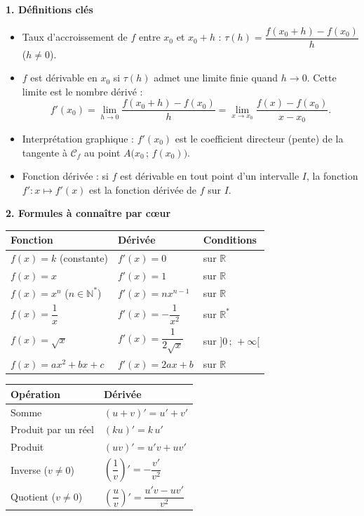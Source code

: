 \documentclass[11pt]{article}
\newcommand{\cle}[1]{{\popxbold\color{popdark}#1}}
\begin{document}
\begin{bilan}
\textbf{1. Définitions clés}
\begin{itemize}
  \item \cle{Taux d'accroissement} de $f$ entre $x_0$ et $x_0+h$ : $\tau(h)=\dfrac{f(x_0+h)-f(x_0)}{h}$ ($h\neq 0$).
  \item $f$ est \cle{dérivable en $x_0$} si $\tau(h)$ admet une limite finie quand $h\to 0$. Cette limite est le \cle{nombre dérivé} :
  \[ f'(x_0)=\lim_{h\to 0}\dfrac{f(x_0+h)-f(x_0)}{h}=\lim_{x\to x_0}\dfrac{f(x)-f(x_0)}{x-x_0}. \]
  \item \cle{Interprétation graphique} : $f'(x_0)$ est le coefficient directeur (pente) de la tangente à $\mathcal{C}_f$ au point $A\bigl(x_0\,;\,f(x_0)\bigr)$.
  \item \cle{Fonction dérivée} : si $f$ est dérivable en tout point d'un intervalle $I$, la fonction $f' : x\mapsto f'(x)$ est la fonction dérivée de $f$ sur $I$.
\end{itemize}

\textbf{2. Formules à connaître par c\oe ur}
\begin{center}
\begin{tabularx}{\linewidth}{|l|X|X|}
\hline
\rowcolor{popblueL} \textbf{Fonction} & \textbf{Dérivée} & \textbf{Conditions} \\
\hline
$f(x)=k$ (constante) & $f'(x)=0$ & sur $\mathbb{R}$ \\
\hline
$f(x)=x$ & $f'(x)=1$ & sur $\mathbb{R}$ \\
\hline
$f(x)=x^n$ ($n\in\mathbb{N}^*$) & $f'(x)=nx^{n-1}$ & sur $\mathbb{R}$ \\
\hline
$f(x)=\dfrac{1}{x}$ & $f'(x)=-\dfrac{1}{x^2}$ & sur $\mathbb{R}^*$ \\
\hline
$f(x)=\sqrt{x}$ & $f'(x)=\dfrac{1}{2\sqrt{x}}$ & sur $]0\,;\,+\infty[$ \\
\hline
$f(x)=ax^2+bx+c$ & $f'(x)=2ax+b$ & sur $\mathbb{R}$ \\
\hline
\end{tabularx}
\end{center}

\begin{center}
\begin{tabularx}{\linewidth}{|l|X|}
\hline
\rowcolor{poporangeL} \textbf{Opération} & \textbf{Dérivée} \\
\hline
Somme & $(u+v)'=u'+v'$ \\
\hline
Produit par un réel & $(ku)'=k\,u'$ \\
\hline
Produit & $(uv)'=u'v+uv'$ \\
\hline
Inverse ($v\neq 0$) & $\left(\dfrac{1}{v}\right)'=-\dfrac{v'}{v^2}$ \\
\hline
Quotient ($v\neq 0$) & $\left(\dfrac{u}{v}\right)'=\dfrac{u'v-uv'}{v^2}$ \\
\hline
\end{tabularx}
\end{center}


\end{bilan}
\end{document}
